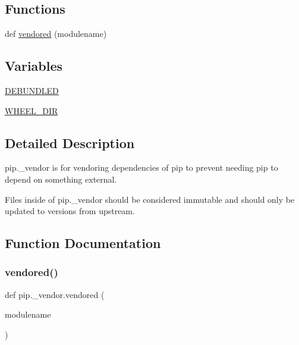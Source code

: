 \subsection*{Functions}
\begin{DoxyCompactItemize}
\item 
def \hyperlink{namespacepip_1_1__vendor_a60bedf38e7943004f5ab2d148356e890}{vendored} (modulename)
\end{DoxyCompactItemize}
\subsection*{Variables}
\begin{DoxyCompactItemize}
\item 
\hyperlink{namespacepip_1_1__vendor_ac246b01584aac7bd75b56f0666ff97b8}{D\+E\+B\+U\+N\+D\+L\+ED}
\item 
\hyperlink{namespacepip_1_1__vendor_af8bd31398248323cdf81be83bf416c4b}{W\+H\+E\+E\+L\+\_\+\+D\+IR}
\end{DoxyCompactItemize}


\subsection{Detailed Description}
\begin{DoxyVerb}pip._vendor is for vendoring dependencies of pip to prevent needing pip to
depend on something external.

Files inside of pip._vendor should be considered immutable and should only be
updated to versions from upstream.
\end{DoxyVerb}
 

\subsection{Function Documentation}
\mbox{\label{namespacepip_1_1__vendor_a60bedf38e7943004f5ab2d148356e890}} 
\subsubsection{\texorpdfstring{vendored()}{vendored()}}
{\footnotesize\ttfamily def pip.\+\_\+vendor.\+vendored (\begin{DoxyParamCaption}\item[{}]{modulename }\end{DoxyParamCaption})}



